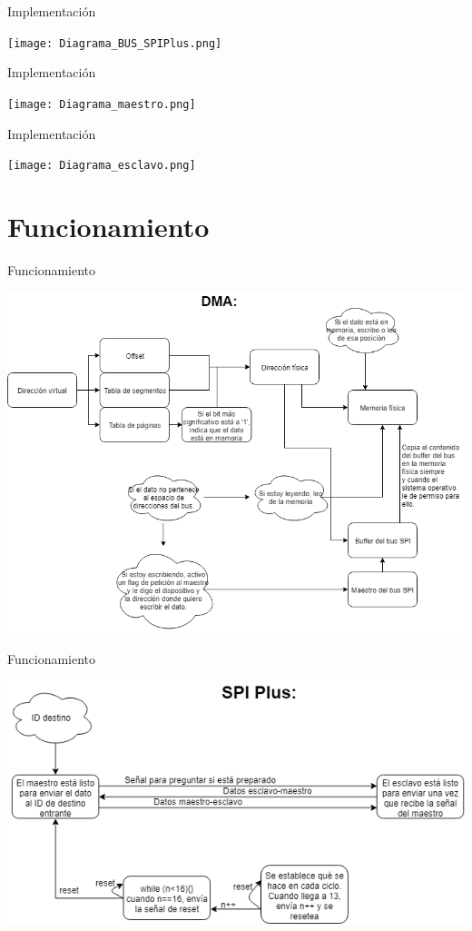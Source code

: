 \documentclass{beamer}
\begin{document}
\begin{frame}{Implementación}
\begin{center}
	\texttt{[image: Diagrama\_BUS\_SPIPlus.png]}
\end{center}
\end{frame}

\begin{frame}{Implementación}
\begin{center}
	\texttt{[image: Diagrama\_maestro.png]}
\end{center}
\end{frame}

\begin{frame}{Implementación}
\begin{center}
	\texttt{[image: Diagrama\_esclavo.png]}
\end{center}
\end{frame}
\section{Funcionamiento}
\begin{frame}{Funcionamiento}
	\begin{center}
		\includegraphics[scale=0.38]{Funcionamiento_DMA.png}
	\end{center}
\end{frame}

\begin{frame}{Funcionamiento}
\begin{center}
	\includegraphics[scale=0.54]{Funcionamiento_SPIPlus.png}
\end{center}
\end{frame}
\end{document}
